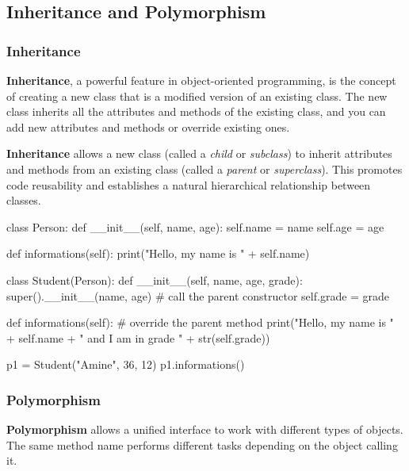 \documentclass[11pt, a4paper]{article}
\begin{document}
\newpage

\subsection{Inheritance and Polymorphism}

\subsubsection{Inheritance}

\textbf{Inheritance}, a powerful feature in object-oriented programming, is the concept of creating a new
class that is a modified version of an existing class. The new class inherits all the attributes and
methods of the existing class, and you can add new attributes and methods or override existing
ones.

\textbf{Inheritance} allows a new class (called a \emph{child} or \emph{subclass}) to inherit attributes and methods from an existing class (called 
a \emph{parent} or \emph{superclass}). This promotes code reusability and establishes a natural hierarchical relationship between classes.

\begin{pycode}
class Person:
    def __init__(self, name, age):
        self.name = name
        self.age = age

    def informations(self):
        print("Hello, my name is " + self.name)

class Student(Person):
    def __init__(self, name, age, grade):
        super().__init__(name, age)   # call the parent constructor
        self.grade = grade

    def informations(self):           # override the parent method
        print("Hello, my name is " + self.name +
              " and I am in grade " + str(self.grade))

p1 = Student("Amine", 36, 12)
p1.informations()
\end{pycode}

\subsubsection{Polymorphism}

\textbf{Polymorphism} allows a unified interface to work with different types of objects. The same method name performs different tasks depending on the object calling it.
\end{document}
